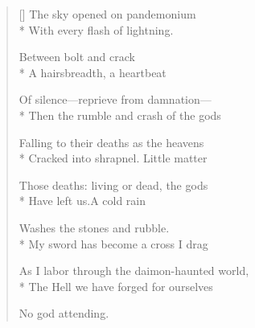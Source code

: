\label{ch:lear_bc}
\settowidth{\versewidth}{As I labor through the daimon-haunted world,}
\begin{verse}[\versewidth]
 The sky opened on pandemonium\\*
With every flash of lightning.

Between bolt and crack\\*
A hairsbreadth, a heartbeat

Of silence---reprieve from damnation---\\*
Then the rumble and crash of the gods

Falling to their deaths as the heavens\\*
Cracked into shrapnel.   Little matter

Those deaths: living or dead, the gods\\*
Have left us.\qquad A cold rain

Washes the stones and rubble.\\*
My sword has become a cross I drag

As I labor through the daimon-haunted world,\\*
The Hell we have forged for ourselves

No god attending.
\end{verse}
